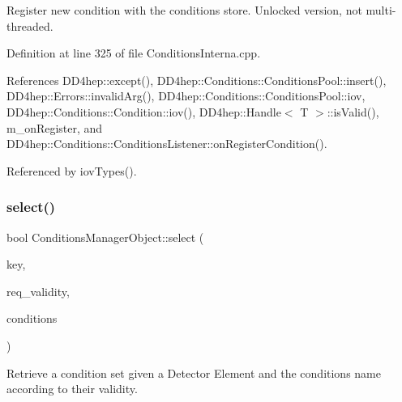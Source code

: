 Register new condition with the conditions store. Unlocked version, not multi-\/threaded. 



Definition at line 325 of file Conditions\+Interna.\+cpp.



References D\+D4hep\+::except(), D\+D4hep\+::\+Conditions\+::\+Conditions\+Pool\+::insert(), D\+D4hep\+::\+Errors\+::invalid\+Arg(), D\+D4hep\+::\+Conditions\+::\+Conditions\+Pool\+::iov, D\+D4hep\+::\+Conditions\+::\+Condition\+::iov(), D\+D4hep\+::\+Handle$<$ T $>$\+::is\+Valid(), m\+\_\+on\+Register, and D\+D4hep\+::\+Conditions\+::\+Conditions\+Listener\+::on\+Register\+Condition().



Referenced by iov\+Types().

\hypertarget{class_d_d4hep_1_1_conditions_1_1_conditions_manager_object_a41d307dce9b135813e089d86f282bebf}{}\label{class_d_d4hep_1_1_conditions_1_1_conditions_manager_object_a41d307dce9b135813e089d86f282bebf} 
\subsubsection{\texorpdfstring{select()}{select()}}
{\footnotesize\ttfamily bool Conditions\+Manager\+Object\+::select (\begin{DoxyParamCaption}\item[{\hyperlink{class_d_d4hep_1_1_conditions_1_1_condition_a7528efa762e8cc072ef80ea67c3531f9}{Condition\+::key\+\_\+type}}]{key,  }\item[{const \hyperlink{class_d_d4hep_1_1_conditions_1_1_conditions_manager_object_a0190ec510ca46da4a1cc908ac3c3a1dd}{iov\+\_\+type} \&}]{req\+\_\+validity,  }\item[{\hyperlink{namespace_d_d4hep_1_1_conditions_ae765f0140a33973a430280f02b6062f4}{Range\+Conditions} \&}]{conditions }\end{DoxyParamCaption})\hspace{0.3cm}{\ttfamily [protected]}}



Retrieve a condition set given a Detector Element and the conditions name according to their validity. 



